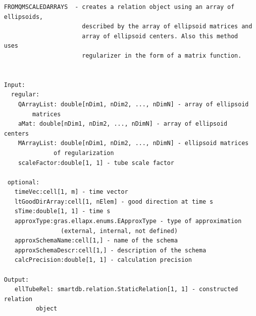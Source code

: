 \documentclass[letterpaper,10pt,english]{sphinxmanual}
\begin{document}
\begin{Verbatim}[commandchars=\\\{\}]
FROMQMSCALEDARRAYS  - creates a relation object using an array of ellipsoids,
                      described by the array of ellipsoid matrices and
                      array of ellipsoid centers. Also this method uses
                      regularizer in the form of a matrix function.


Input:
  regular:
    QArrayList: double[nDim1, nDim2, ..., nDimN] - array of ellipsoid
        matrices
    aMat: double[nDim1, nDim2, ..., nDimN] - array of ellipsoid centers
    MArrayList: double[nDim1, nDim2, ..., nDimN] - ellipsoid matrices
              of regularization
    scaleFactor:double[1, 1] - tube scale factor

 optional:
   timeVec:cell[1, m] - time vector
   ltGoodDirArray:cell[1, nElem] - good direction at time s
   sTime:double[1, 1] - time s
   approxType:gras.ellapx.enums.EApproxType - type of approximation
                (external, internal, not defined)
   approxSchemaName:cell[1,] - name of the schema
   approxSchemaDescr:cell[1,] - description of the schema
   calcPrecision:double[1, 1] - calculation precision

Output:
   ellTubeRel: smartdb.relation.StaticRelation[1, 1] - constructed relation
         object
\end{Verbatim}
\end{document}
